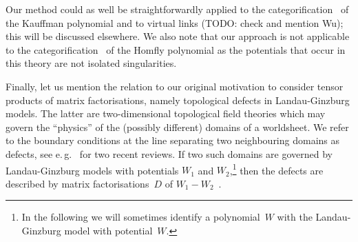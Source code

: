 \documentclass{compositio}
\theoremstyle{definition}
\numberwithin{equation}{section}
\begin{document}
Our method could as well be straightforwardly applied to the categorification~\cite{kr0701333} of the Kauffman polynomial and to virtual links (TODO: check and mention Wu); this will be discussed elsewhere. We also note that our approach is not applicable to the categorification~\cite{kr0505056} of the Homfly polynomial as the potentials that occur in this theory are not isolated singularities. 

\medskip

Finally, let us mention the relation to our original motivation to consider tensor products of matrix factorisations, namely topological defects in Landau-Ginzburg models. The latter are two-dimensional topological field theories which may govern the ``physics'' of the (possibly different) domains of a worldsheet.  We refer to the boundary conditions at the line separating two neighbouring domains as defects, see e.\,g.~\cite{k1004.2307, dkr1107.0495} for two recent reviews. If two such domains are governed by Landau-Ginzburg models with potentials $W_{1}$ and $W_{2}$,\footnote{In the following we will sometimes identify a polynomial~$W$ with the Landau-Ginzburg model with potential~$W$.} then the defects are described by matrix factorisations~$D$ of $W_{1}-W_{2}$~\cite{br0707.0922}. 
\end{document}
